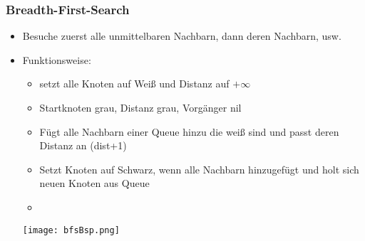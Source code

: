 \subsubsection{Breadth-First-Search}
\begin{itemize}
    \item Besuche zuerst alle unmittelbaren Nachbarn, dann deren Nachbarn, usw.
    \item Funktionsweise:
        \begin{itemize}
            \item setzt alle Knoten auf Weiß und Distanz auf $+\infty$
            \item Startknoten grau, Distanz grau, Vorgänger nil
            \item Fügt alle Nachbarn einer Queue hinzu die weiß sind und passt deren Distanz an (dist+1)
            \item Setzt Knoten auf Schwarz, wenn alle Nachbarn hinzugefügt und holt sich neuen Knoten aus Queue
            \item
        \end{itemize}
\centerline{\texttt{[image: bfsBsp.png]}}


\end{itemize}
